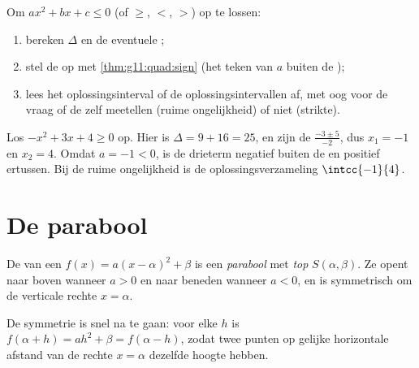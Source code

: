\begin{method}\label{met:g11:quad:inequalities}
Om $ax^2 + bx + c \leq 0$ (of $\geq$, $<$, $>$) op te lossen:
\begin{enumerate}
  \item bereken $\Delta$ en de eventuele ;
  \item stel de  op met \cref{thm:g11:quad:sign} (het teken van $a$
        buiten de );
  \item lees het oplossingsinterval of de oplossingsintervallen af, met oog
        voor de vraag of de  zelf meetellen (ruime ongelijkheid) of
        niet (strikte).
\end{enumerate}
\end{method}

\begin{example}\label{ex:g11:quad:inequality}
Los $-x^2 + 3x + 4 \geq 0$ op. Hier is $\Delta = 9 + 16 = 25$, en zijn de
 $\frac{-3 \pm 5}{-2}$, dus $x_1 = -1$ en $x_2 = 4$. Omdat
$a = -1 < 0$, is de drieterm negatief buiten de  en positief ertussen.
Bij de ruime ongelijkheid is de oplossingsverzameling $\intcc{-1}{4}$.
\end{example}

\section{De parabool}

\begin{definition}[Parabool]\label{def:g11:quad:parabola}
De  van een  $f(x) = a(x-\alpha)^2+\beta$ is een
\emph{parabool} met \emph{top} $S(\alpha, \beta)$. Ze opent
naar boven wanneer $a > 0$ en naar beneden wanneer $a < 0$, en is
symmetrisch om de verticale rechte $x = \alpha$.
\end{definition}

\begin{remark}
De symmetrie is snel na te gaan: voor elke $h$ is
$f(\alpha + h) = ah^2 + \beta = f(\alpha - h)$, zodat twee punten op gelijke
horizontale afstand van de rechte $x = \alpha$ dezelfde hoogte hebben.
\end{remark}

